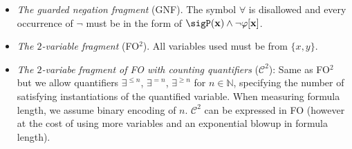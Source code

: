 \begin{itemize}
	\item
	\emph{The guarded negation fragment} (GNF). The symbol $\forall$ is disallowed 
	and every occurrence of $\neg$ must be in the form of
	$\sigP(\bold{x}) \wedge \neg \varphi[\bold{x}]$.
	\item
	\emph{The $2$-variable fragment} (FO$^2$). All variables used must be from $\{x,y\}$.
	\item
	\emph{The $2$-variabe fragment of FO with counting quantifiers} ($\mathcal{C}^2$): Same as FO$^2$ but we allow quantifiers $\exists^{\leq n}$, $\exists^{= n}$, $\exists^{\geq n}$ for $n\in \mathbb{N}$, specifying the number of satisfying instantiations of the quantified variable. When measuring formula length, we assume binary encoding of $n$. $\mathcal{C}^2$ can be expressed in FO (however at the cost of using more variables and an exponential blowup in formula length).
\end{itemize}

